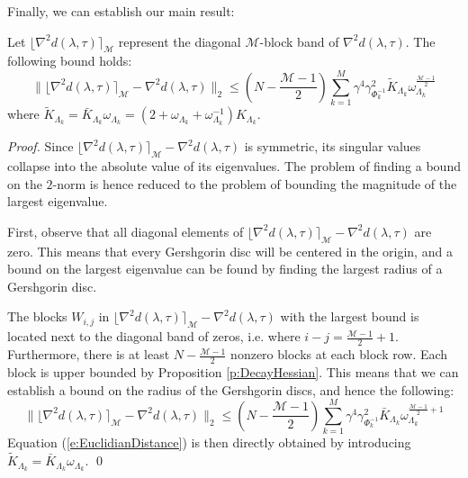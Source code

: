 Finally, we can establish our main result:
\begin{lemma} \label{l:EuclidianDistance}
Let $ \lfloor \nabla^2 d(\lambda, \tau) \rceil_{\mathcal{M}}$ represent the diagonal $\mathcal{M}$-block band of $\nabla^2 d(\lambda, \tau)$. The following bound holds:
\begin{equation} \label{e:EuclidianDistance}
\| \lfloor \nabla^2 d(\lambda, \tau) \rceil_{\mathcal{M}} - \nabla^2 d(\lambda, \tau) \|_2 \leq \left( N -\frac{\mathcal{M} - 1}{2} \right) \sum_{k=1}^M \gamma^4 \gamma_{\Phi_k^{-1}}^2 \tilde{K}_{\Lambda_k} \omega_{\Lambda_k}^{\frac{\mathcal{M} - 1}{2}}
\end{equation}
where $\tilde{K}_{\Lambda_k} = \bar{K}_{\Lambda_k} \omega_{\Lambda_k} =  (2 + \omega_{\Lambda_k} + \omega_{\Lambda_k}^{-1}) K_{\Lambda_k}$.
\end{lemma}
\begin{proof}
Since $\lfloor \nabla^2 d(\lambda, \tau) \rceil_{\mathcal{M}} - \nabla^2 d(\lambda, \tau)$ is symmetric, its singular values collapse into the absolute value of its eigenvalues. The problem of finding a bound on the $2$-norm is hence reduced to the problem of bounding the magnitude of the largest eigenvalue.

First, observe that all diagonal elements of $\lfloor \nabla^2 d(\lambda, \tau) \rceil_{\mathcal{M}} - \nabla^2 d(\lambda, \tau)$ are zero. This means that every Gershgorin disc will be centered in the origin, and a bound on the largest eigenvalue can be found by finding the largest radius of a Gershgorin disc.

The blocks $W_{i,j}$ in $\lfloor \nabla^2 d(\lambda, \tau) \rceil_{\mathcal{M}} - \nabla^2 d(\lambda, \tau)$ with the largest bound is located next to the diagonal band of zeros, i.e. where $i - j = \frac{\mathcal{M} - 1}{2} + 1$. Furthermore, there is at least $N -\frac{\mathcal{M} - 1}{2}$ nonzero blocks at each block row. Each block is upper bounded by Proposition \ref{p:DecayHessian}. This means that we can establish a bound on the radius of the Gershgorin discs, and hence the following:
\begin{equation}
\| \lfloor \nabla^2 d(\lambda, \tau) \rceil_{\mathcal{M}} - \nabla^2 d(\lambda, \tau) \|_2 \leq \left( N -\frac{\mathcal{M} - 1}{2} \right) \sum_{k=1}^M \gamma^4 \gamma_{\Phi_k^{-1}}^2 \bar{K}_{\Lambda_k} \omega_{\Lambda_k}^{\frac{\mathcal{M} - 1}{2} + 1}
\end{equation}
Equation (\ref{e:EuclidianDistance}) is then directly obtained by introducing $\tilde{K}_{\Lambda_k} = \bar{K}_{\Lambda_k} \omega_{\Lambda_k}$.
\qed
\end{proof}

